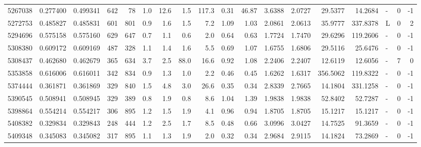 \begin{tabular}{rrrrrrrrrrrrrrrlrr}
   5267038 & 0.277400 &   0.499341 &  642 &   78 &      1.0 &     12.6 &     1.5 &    117.3 &       0.31 &       46.87 &  3.6388 &  2.0727 &   29.5377 &   14.2684 &             - &        0 &         -1 \\
   5272753 & 0.485827 &   0.485831 &  601 &  801 &      0.9 &      1.6 &     1.5 &      7.2 &       1.09 &        1.03 &  2.0861 &  2.0613 &   35.9777 &  337.8378 &             L &        0 &          2 \\
   5294696 & 0.575158 &   0.575160 &  629 &  647 &      0.7 &      1.1 &     0.6 &      2.0 &       0.64 &        0.63 &  1.7724 &  1.7470 &   29.6296 &  119.2606 &             - &        0 &         -1 \\
   5308380 & 0.609172 &   0.609169 &  487 &  328 &      1.1 &      1.4 &     1.6 &      5.5 &       0.69 &        1.07 &  1.6755 &  1.6806 &   29.5116 &   25.6476 &             - &        0 &         -1 \\
   5308437 & 0.462680 &   0.462679 &  365 &  634 &      3.7 &      2.5 &    88.0 &     16.6 &       0.92 &        1.08 &  2.2406 &  2.2407 &   12.6119 &   12.6056 &             - &        7 &          0 \\
   5353858 & 0.616006 &   0.616011 &  342 &  834 &      0.9 &      1.3 &     1.0 &      2.2 &       0.46 &        0.45 &  1.6262 &  1.6317 &  356.5062 &  119.8322 &             - &        0 &         -1 \\
   5374444 & 0.361871 &   0.361869 &  329 &  840 &      1.5 &      4.8 &     3.0 &     26.6 &       0.35 &        0.34 &  2.8339 &  2.7665 &   14.1804 &  331.1258 &             - &        0 &         -1 \\
   5390545 & 0.508941 &   0.508945 &  329 &  389 &      0.8 &      1.9 &     0.8 &      8.6 &       1.04 &        1.39 &  1.9838 &  1.9838 &   52.8402 &   52.7287 &             - &        0 &         -1 \\
   5398864 & 0.554214 &   0.554217 &  306 &  895 &      1.2 &      1.5 &     1.9 &      4.1 &       0.96 &        0.94 &  1.8705 &  1.8705 &   15.1217 &   15.1217 &             - &        0 &         -1 \\
   5408382 & 0.329834 &   0.329843 &  248 &  444 &      1.2 &      2.5 &     1.7 &      8.5 &       0.48 &        0.66 &  3.0996 &  3.0427 &   14.7525 &   91.3659 &             - &        0 &         -1 \\
   5409348 & 0.345083 &   0.345082 &  317 &  895 &      1.1 &      1.3 &     1.9 &      2.0 &       0.32 &        0.34 &  2.9684 &  2.9115 &   14.1824 &   73.2869 &             - &        0 &         -1 \\

\end{tabular}
